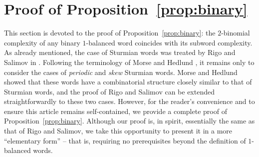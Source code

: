 \documentclass{template_arxiv}
\theoremstyle{definition}
\begin{document}
\section{Proof of Proposition~\ref{prop:binary}}\label{sec:binary}

This section is devoted to the proof of Proposition~\ref{prop:binary}: the $2$-binomial complexity of any binary $1$-balanced word coincides with its subword complexity. As already mentioned, the case of Sturmian words was treated by Rigo and Salimov in \cite{RS15}. Following the terminology of Morse and Hedlund \cite{MH40}, it remains only to consider the cases of \emph{periodic} and \emph{skew} Sturmian words. Morse and Hedlund showed that these words have a combinatorial structure closely similar to that of Sturmian words, and the proof of Rigo and Salimov can be extended straightforwardly to these two cases. However, for the reader's convenience and to ensure this article remains self-contained, we provide a complete proof of Proposition~\ref{prop:binary}. Although our proof is, in spirit, essentially the same as that of Rigo and Salimov, we take this opportunity to present it in a more ``elementary form'' -- that is, requiring no prerequisites beyond the definition of $1$-balanced words.
\end{document}
